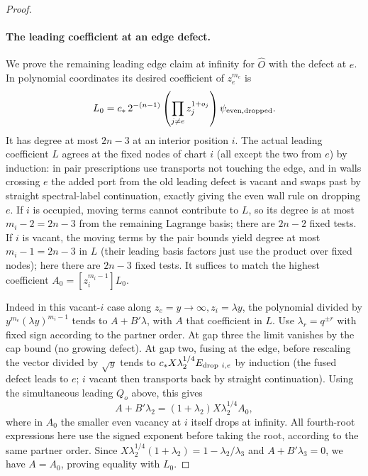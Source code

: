 \begin{proof}
\paragraph{The leading coefficient at an edge defect.}
We prove the remaining leading edge claim at infinity for \(\widehat O\)
with the defect at \(e\). In polynomial coordinates its desired coefficient of \(z_e^{m_e}\) is
\[
 L_0= c_*\,2^{-(n-1)}\left(\prod_{j\ne e} z_j^{1+o_j}\right)
       \psi_{\rm even,dropped}.
\]
It has degree at most \(2n-3\) at an interior position \(i\). The actual leading coefficient \(L\) agrees at the fixed nodes of chart \(i\) (all except the two from \(e\)) by induction: in pair prescriptions use transports not touching the edge, and in walls crossing \(e\) the added port from the old leading defect is vacant and swaps past by straight spectral-label continuation, exactly giving the even wall rule on dropping \(e\). If \(i\) is occupied, moving terms cannot contribute to \(L\), so its degree is at most \(m_i-2=2n-3\) from the remaining Lagrange basis; there are \(2n-2\) fixed tests. If \(i\) is vacant, the moving terms by the pair bounds yield degree at most \(m_i-1=2n-3\) in \(L\) (their leading basis factors just use the product over fixed nodes); here there are \(2n-3\) fixed tests. It suffices to match the highest coefficient \(A_0=[z_i^{m_i-1}] L_0\).

Indeed in this vacant-\(i\) case along \(z_e=y\to\infty,z_i=\lambda y\), the polynomial divided by \(y^{m_e}(\lambda y)^{m_i-1}\) tends to \(A+B'\lambda\), with \(A\) that coefficient in \(L\). Use \(\lambda_r=q^{\pm r}\) with fixed sign according to the partner order. At gap three the limit vanishes by the cap bound (no growing defect). At gap two, fusing at the edge, before rescaling the vector divided by \(\sqrt y\) tends to \(c_* X\lambda_2^{1/4} E_{{\rm drop}\ i,e}\) by induction (the fused defect leads to \(e\); \(i\) vacant then transports back by straight continuation). Using the simultaneous leading \(Q_o\) above, this gives
\[
 A+B'\lambda_2=(1+\lambda_2) X\lambda_2^{1/4} A_0 ,
\]
where in \(A_0\) the smaller even vacancy at \(i\) itself drops at infinity. All fourth-root expressions here use the signed exponent before taking the root, according to the same partner order. Since \(X\lambda_2^{1/4}(1+\lambda_2)=1-\lambda_2/\lambda_3\) and \(A+B'\lambda_3=0\), we have \(A=A_0\), proving equality with \(L_0\).


\end{proof}
